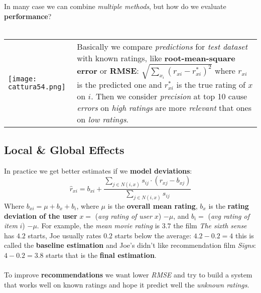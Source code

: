 \documentclass{article}
\begin{document}
In many case we can combine \emph{multiple methods}, but how do we evaluate \textbf{performance}? \\\\
\begin{tabular}{C{8cm}  L{7cm}}
\texttt{[image: cattura54.png]} &
Basically we compare \emph{predictions} for \emph{test dataset} with known ratings, like \textbf{root-mean-square error} or \textbf{RMSE}: $\sqrt{ \sum_{x_i} (r_{xi} - r_{xi}^*)^2}$ where $r_{xi}$ is the predicted one and $r_{xi}^*$ is the true rating of $x$ on $i$. Then we consider \emph{precision} at top 10 cause \emph{errors} on \emph{high ratings} are more \emph{relevant} that ones on \emph{low ratings}. 
\end{tabular}
\subsection{Local \& Global Effects}
In practice we get better estimates if we \textbf{model deviations}: \[\hat{r}_{xi} = b_{xi} + \frac {\sum_{j \in N(i,x)} s_{ij} \cdot (r_{xj} - b_{xj})}{\sum_{j \in N(i,x)} s_{ij}}\]
Where $b_{xi} = \mu  +b_x + b_i$, where $\mu$ is the \textbf{overall mean rating}, $b_x$ is the \textbf{rating deviation of the user} $x =$ (\emph{avg rating of user} $x$) $- \mu$, and $b_i = $ (\emph{avg rating of item} $i$) $- \mu$. For example, the \emph{mean movie rating} is $3.7$ the film \emph{The sixth sense} has $4.2$ starts, Joe usually rates $0.2$ starts below the average: $4.2 - 0.2 = 4$ this is called the \textbf{baseline estimation} and Joe's didn't like recommendation film \emph{Signs}: $4- 0.2 = 3.8$ starts that is the \textbf{final estimation}. \\\\
To improve \textbf{recommendations} we want lower \emph{RMSE} and try to build a system that works well on known ratings and hope it predict well the \emph{unknown ratings}.
\end{document}
